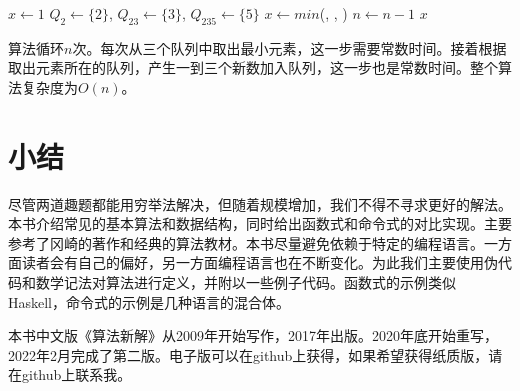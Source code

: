 \documentclass[b5paper]{ctexart}
\begin{document}
\begin{algorithmic}[1]
  \State $x \gets 1$
  \State $Q_2 \gets \{ 2 \}$, $Q_{23} \gets \{ 3 \}$, $Q_{235} \gets \{ 5 \}$
    \State $x \gets min$(, , )
      \State {}
      \State {}
      \State {}
      \State {}
      \State {}
      \State {}
      \State {}
    \Else
      \State {}
      \State {}
    \EndIf
    \State $n \gets n - 1$
  \EndWhile
  \State \Return $x$
\EndFunction
\end{algorithmic}

算法循环$n$次。每次从三个队列中取出最小元素，这一步需要常数时间。接着根据取出元素所在的队列，产生一到三个新数加入队列，这一步也是常数时间。整个算法复杂度为$O(n)$。

\section*{小结}
尽管两道趣题都能用穷举法解决，但随着规模增加，我们不得不寻求更好的解法。本书介绍常见的基本算法和数据结构，同时给出函数式和命令式的对比实现。主要参考了冈崎的著作\cite{okasaki-book}和经典的算法教材\cite{CLRS}。本书尽量避免依赖于特定的编程语言。一方面读者会有自己的偏好，另一方面编程语言也在不断变化。为此我们主要使用伪代码和数学记法对算法进行定义，并附以一些例子代码。函数式的示例类似Haskell，命令式的示例是几种语言的混合体。

本书中文版《算法新解》从2009年开始写作，2017年出版。2020年底开始重写，2022年2月完成了第二版。电子版可以在github上获得，如果希望获得纸质版，请在github上联系我。
\end{document}
